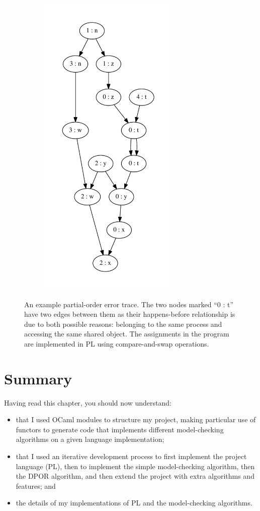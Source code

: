 \documentclass[12pt,a4paper,twoside,openright]{report}
\newenvironment{understandinglist}
	{\begin{itemize} \itemsep 0em}{\end{itemize}}
\begin{document}
\begin{figure}
\begin{subfigure}{0.5\textwidth}
		\includegraphics[height=15cm]{error_trace}
	\end{subfigure}
	\caption[An example partial-order
		error trace.]{An example partial-order
			error trace. The two nodes marked
			``0 : t'' have two edges between them
			as their happens-before relationship
			is due to both possible reasons:
			belonging to the
			same process and accessing the same
			shared object. The assignments in
			the program are implemented in PL
			using compare-and-swap operations.}
	\label{fig:trace-example}
\end{figure}

\section{Summary}
Having read this chapter,
you should now understand:
\begin{understandinglist}
	\item that I used OCaml modules to
	structure my project, making
	particular use of functors to generate
	code that implements different model-checking
	algorithms on a given language implementation;
	\item that I used an iterative development
	process to first implement the project
	language (PL), then to implement the simple
	model-checking algorithm, then
	the DPOR algorithm, and then extend the project
	with extra algorithms and features; and
	\item the details of my
	implementations of PL and the
	model-checking algorithms.
	\end{understandinglist}
\end{document}

